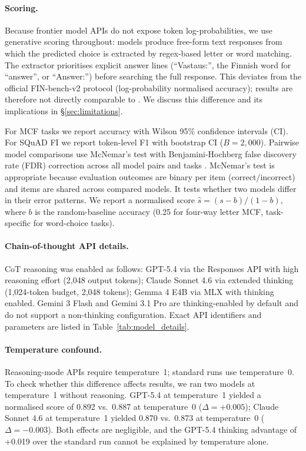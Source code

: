 \documentclass[11pt]{article}
\begin{document}
\paragraph{Scoring.}
Because frontier model APIs do not expose token log-probabilities,
we use generative scoring throughout: models produce free-form text
responses from which the predicted choice is extracted by
regex-based letter or word matching.
The extractor prioritises explicit answer lines
(``Vastaus:'', the Finnish word for ``answer'', or ``Answer:'')
before searching the full response.
This deviates from the official FIN-bench-v2 protocol
(log-probability normalised accuracy); results are therefore not directly
comparable to \citet{kytoniemi2025}.
We discuss this difference and its implications in \S\ref{sec:limitations}.

For MCF tasks we report accuracy with Wilson 95\% confidence intervals (CI).
For SQuAD FI we report token-level F1 with bootstrap CI ($B=2{,}000$).
Pairwise model comparisons use McNemar's test with Benjamini-Hochberg
false discovery rate (FDR) correction across all model pairs and tasks
\cite{mcnemar1947,benjamini1995}.
McNemar's test is appropriate because evaluation outcomes are binary per
item (correct/incorrect) and items are shared across compared models.
It tests whether two models differ in their error patterns.
We report a normalised score $\hat{s} = (s - b) / (1 - b)$, where $b$ is
the random-baseline accuracy (0.25 for four-way letter MCF,
task-specific for word-choice tasks).

\paragraph{Chain-of-thought API details.}
CoT reasoning was enabled as follows:
GPT-5.4 via the Responses API with high reasoning effort (2{,}048 output tokens);
Claude Sonnet 4.6 via extended thinking (1{,}024-token budget, 2{,}048 tokens);
Gemma 4 E4B via MLX with thinking enabled.
Gemini 3 Flash and Gemini 3.1 Pro are thinking-enabled by default
and do not support a non-thinking configuration.
Exact API identifiers and parameters are listed in
Table~\ref{tab:model_details}.

\paragraph{Temperature confound.}
Reasoning-mode APIs require temperature~1; standard runs use temperature~0.
To check whether this difference affects results, we ran two models at
temperature~1 without reasoning.
GPT-5.4 at temperature~1 yielded a normalised score of 0.892 vs.\ 0.887 at
temperature~0 ($\Delta = +0.005$); Claude Sonnet 4.6 at temperature~1 yielded
0.870 vs.\ 0.873 at temperature~0 ($\Delta = -0.003$).
Both effects are negligible, and the GPT-5.4 thinking advantage of +0.019 over
the standard run cannot be explained by temperature alone.
\end{document}
